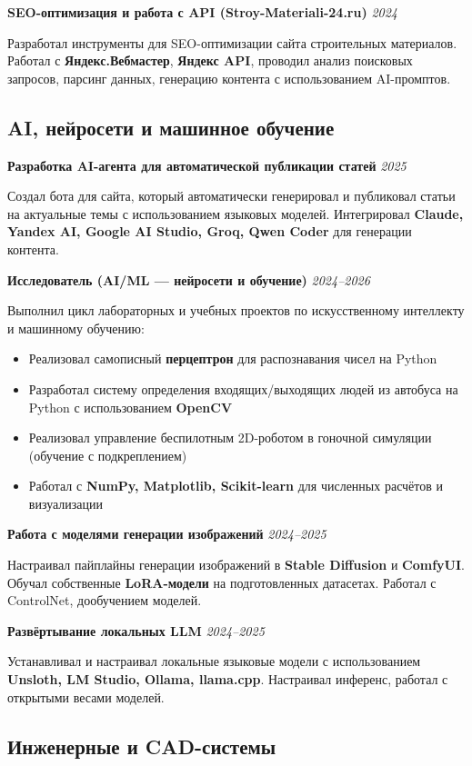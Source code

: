 \documentclass[10pt,a4paper]{article}
\newcommand{\projectEntry}[3]{\textbf{#1} \hfill \textit{#2}\par #3\par\vspace{0.3em}}
\begin{document}
\projectEntry{SEO-оптимизация и работа с API (Stroy-Materiali-24.ru)}{2024}
{Разработал инструменты для SEO-оптимизации сайта строительных материалов. Работал с \textbf{Яндекс.Вебмастер}, \textbf{Яндекс API}, проводил анализ поисковых запросов, парсинг данных, генерацию контента с использованием AI-промптов.}

\subsection{AI, нейросети и машинное обучение}

\projectEntry{Разработка AI-агента для автоматической публикации статей}{2025}
{Создал бота для сайта, который автоматически генерировал и публиковал статьи на актуальные темы с использованием языковых моделей. Интегрировал \textbf{Claude, Yandex AI, Google AI Studio, Groq, Qwen Coder} для генерации контента.}

\projectEntry{Исследователь (AI/ML — нейросети и обучение)}{2024–2026}
{Выполнил цикл лабораторных и учебных проектов по искусственному интеллекту и машинному обучению:
\begin{itemize}
    \item Реализовал самописный \textbf{перцептрон} для распознавания чисел на Python
    \item Разработал систему определения входящих/выходящих людей из автобуса на Python с использованием \textbf{OpenCV}
    \item Реализовал управление беспилотным 2D-роботом в гоночной симуляции (обучение с подкреплением)
    \item Работал с \textbf{NumPy, Matplotlib, Scikit-learn} для численных расчётов и визуализации
\end{itemize}}

\projectEntry{Работа с моделями генерации изображений}{2024–2025}
{Настраивал пайплайны генерации изображений в \textbf{Stable Diffusion} и \textbf{ComfyUI}. Обучал собственные \textbf{LoRA-модели} на подготовленных датасетах. Работал с ControlNet, дообучением моделей.}

\projectEntry{Развёртывание локальных LLM}{2024–2025}
{Устанавливал и настраивал локальные языковые модели с использованием \textbf{Unsloth, LM Studio, Ollama, llama.cpp}. Настраивал инференс, работал с открытыми весами моделей.}

\subsection{Инженерные и CAD-системы}
\end{document}
